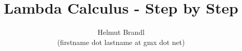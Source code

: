 \documentclass[12pt]{article}
\begin{document}


\title{Lambda Calculus - Step by Step}
\author{Helmut Brandl \\ \scriptsize (firstname dot lastname at gmx dot net)}
\date{}


\maketitle

\tableofcontents



















\end{document}
